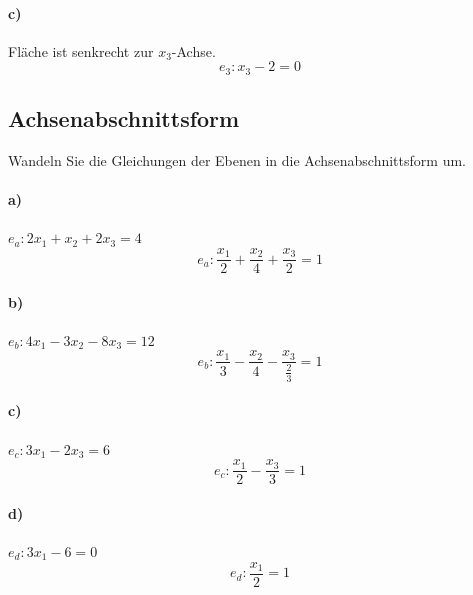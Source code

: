 \documentclass{ajc}
\numberwithin{equation}{subsection}
\begin{document}
	\paragraph{c)} Fläche ist senkrecht zur $x_3$-Achse.
	\begin{equation}
		e_3: x_3 - 2 = 0
	\end{equation}
	
	\subsection{Achsenabschnittsform}
	Wandeln Sie die Gleichungen der Ebenen in die Achsenabschnittsform um.
	
	\paragraph{a)} $e_a: 2x_1 + x_2 + 2x_3 = 4$
	\begin{equation}
		e_a: \frac{x_1}{2} + \frac{x_2}{4} + \frac{x_3}{2} = 1
	\end{equation}
	
	\paragraph{b)} $e_b: 4x_1 - 3x_2 - 8x_3 = 12$
	\begin{equation}
		e_b: \frac{x_1}{3} - \frac{x_2}{4} - \frac{x_3}{\frac{2}{3}} = 1
	\end{equation}
	
	\paragraph{c)} $e_c: 3x_1 - 2x_3 = 6$
	\begin{equation}
		e_c: \frac{x_1}{2} - \frac{x_3}{3} = 1
	\end{equation}
	
	\paragraph{d)} $e_d: 3x_1 - 6 = 0$
	\begin{equation}
		e_d: \frac{x_1}{2} = 1
	\end{equation}
	
\end{document}
